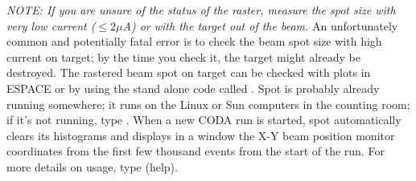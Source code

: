 {\it NOTE:  If you are unsure of the status of the raster,
measure the spot size with very low current ($\le 2 \mu$A) or with
the target out of the beam.}  An unfortunately common and 
potentially fatal error 
is to check the beam spot size with high current on target; by
the time you check it, the target might already be destroyed.
The rastered beam spot on target can be checked with
plots in ESPACE or by using the stand alone code called .
Spot is probably already running somewhere; it runs on the 
Linux or Sun computers in the counting room; if it's not
running, type .  When a new CODA run is started,
spot automatically clears its histograms and displays 
in a window the X-Y beam position monitor
coordinates from the first few thousand events from the
start of the run.  
For more details on usage, type  (help).


%
%
%
%
